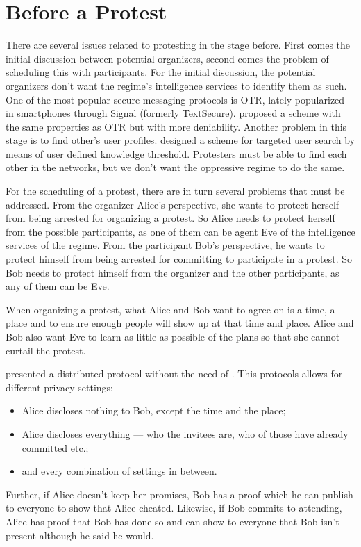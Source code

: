 \section{Before a Protest}
\label{BeforeProtest}

There are several issues related to protesting in the stage before.
First comes the initial discussion between potential organizers, second comes 
the problem of scheduling this with participants.
For the initial discussion, the potential organizers don't want the regime's 
intelligence services to identify them as such.
One of the most popular secure-messaging protocols is \ac{OTR}, lately 
popularized in smartphones through Signal (formerly TextSecure).
\citet{OTPKX} proposed a scheme with the same properties as \ac{OTR} but with 
more deniability.
Another problem in this stage is to find other's user profiles.
\citet{ThresholdUserSearch} designed a scheme for targeted user search by means 
of user defined knowledge threshold.
Protesters must be able to find each other in the networks, but we don't want 
the oppressive regime to do the same.

For the scheduling of a protest, there are in turn several problems that must 
be addressed.
From the organizer Alice's perspective, she wants to protect herself from being 
arrested for organizing a protest.
So Alice needs to protect herself from the possible participants, as one of 
them can be agent Eve of the intelligence services of the regime.
From the participant Bob's perspective, he wants to protect himself from being 
arrested for committing to participate in a protest.
So Bob needs to protect himself from the organizer and the other participants, 
as any of them can be Eve.

When organizing a protest, what Alice and Bob want to agree on is a time, 
a place and to ensure enough people will show up at that time and place.
Alice and Bob also want Eve to learn as little as possible of the plans so 
that she cannot curtail the protest.

\citet{EventsInvitations} presented a distributed protocol without the need of 
.
This protocols allows for different privacy settings:
\begin{itemize}
\item Alice discloses nothing to Bob, except the time and the place;
\item Alice discloses everything --- who the invitees are, who of those have 
  already committed etc.;
\item and every combination of settings in between.
\end{itemize}
Further, if Alice doesn't keep her promises, Bob has a proof which he can 
publish to everyone to show that Alice cheated.
Likewise, if Bob commits to attending, Alice has proof that Bob has done so and 
can show to everyone that Bob isn't present although he said he would.

